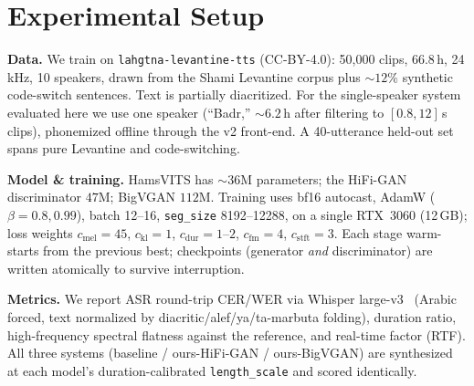\documentclass[10pt,twocolumn]{article}
\begin{document}
\section{Experimental Setup}
\textbf{Data.} We train on \texttt{lahgtna-levantine-tts} (CC-BY-4.0): 50{,}000 clips,
66.8\,h, 24\,kHz, 10 speakers, drawn from the Shami Levantine corpus plus \(\sim\!12\%\)
synthetic code-switch sentences. Text is partially diacritized. For the single-speaker system
evaluated here we use one speaker (``Badr,'' \(\sim\!6.2\)\,h after filtering to
\([0.8,12]\)\,s clips), phonemized offline through the v2 front-end. A 40-utterance held-out
set spans pure Levantine and code-switching.

\textbf{Model \& training.} HamsVITS has \(\sim\!36\)M parameters; the HiFi-GAN
discriminator \(47\)M; BigVGAN \(112\)M. Training uses bf16 autocast, AdamW
(\(\beta\!=\!0.8,0.99\)), batch 12--16, \texttt{seg\_size} 8192--12288, on a single RTX~3060
(12\,GB); loss weights \(c_{\text{mel}}\!=\!45\), \(c_{\text{kl}}\!=\!1\),
\(c_{\text{dur}}\!=\!1\text{--}2\), \(c_{\text{fm}}\!=\!4\), \(c_{\text{stft}}\!=\!3\). Each
stage warm-starts from the previous best; checkpoints (generator \emph{and} discriminator)
are written atomically to survive interruption.

\textbf{Metrics.} We report ASR round-trip CER/WER via Whisper large-v3~\cite{whisper}
(Arabic forced, text normalized by diacritic/alef/ya/ta-marbuta folding), duration ratio,
high-frequency spectral flatness against the reference, and real-time factor (RTF). All three
systems (baseline / ours-HiFi-GAN / ours-BigVGAN) are synthesized at each model's
duration-calibrated \texttt{length\_scale} and scored identically.
\end{document}
